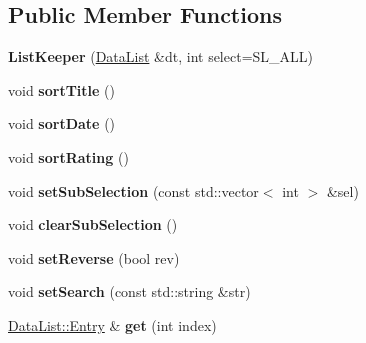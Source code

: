 \subsection*{Public Member Functions}
\begin{DoxyCompactItemize}
\item 
\hypertarget{class_list_keeper_a95c2c91604f3392c75ba2a9f5795e568}{{\bfseries List\-Keeper} (\hyperlink{struct_data_list}{Data\-List} \&dt, int select=S\-L\-\_\-\-A\-L\-L)}\label{class_list_keeper_a95c2c91604f3392c75ba2a9f5795e568}

\item 
\hypertarget{class_list_keeper_a8ca3060cec18ba687076c8aad8ec0303}{void {\bfseries sort\-Title} ()}\label{class_list_keeper_a8ca3060cec18ba687076c8aad8ec0303}

\item 
\hypertarget{class_list_keeper_acf69e7b0ef65ea2513dcab9716147ec3}{void {\bfseries sort\-Date} ()}\label{class_list_keeper_acf69e7b0ef65ea2513dcab9716147ec3}

\item 
\hypertarget{class_list_keeper_a2585e76fcd54315ab6fee645b95e82fb}{void {\bfseries sort\-Rating} ()}\label{class_list_keeper_a2585e76fcd54315ab6fee645b95e82fb}

\item 
\hypertarget{class_list_keeper_ab4dc65a6d5654a19cac4b40870f1e1dc}{void {\bfseries set\-Sub\-Selection} (const std\-::vector$<$ int $>$ \&sel)}\label{class_list_keeper_ab4dc65a6d5654a19cac4b40870f1e1dc}

\item 
\hypertarget{class_list_keeper_abb1d448730317cffc617559514a8425c}{void {\bfseries clear\-Sub\-Selection} ()}\label{class_list_keeper_abb1d448730317cffc617559514a8425c}

\item 
\hypertarget{class_list_keeper_ac26d1ea0157a568bb18f2e7f2660051f}{void {\bfseries set\-Reverse} (bool rev)}\label{class_list_keeper_ac26d1ea0157a568bb18f2e7f2660051f}

\item 
\hypertarget{class_list_keeper_ad75a551a7da3eb197bbead89c9f1d2df}{void {\bfseries set\-Search} (const std\-::string \&str)}\label{class_list_keeper_ad75a551a7da3eb197bbead89c9f1d2df}

\item 
\hypertarget{class_list_keeper_aa51f63a11d4e5aa4ebc8a39bc7253201}{\hyperlink{struct_data_list_1_1_entry}{Data\-List\-::\-Entry} \& {\bfseries get} (int index)}\label{class_list_keeper_aa51f63a11d4e5aa4ebc8a39bc7253201}


\end{DoxyCompactItemize}
